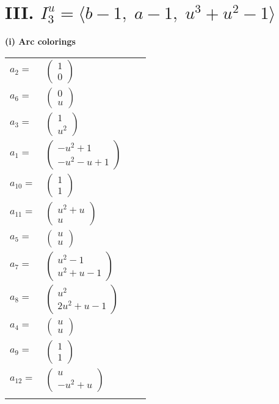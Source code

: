 \documentclass[1p]{elsarticle_modified}
\theoremstyle{definition}
\begin{document}
\centering \section*{III. $I^u_{3}= \langle b-1,\;a-1,\;u^3+u^2-1 \rangle$}
\flushleft \textbf{(i) Arc colorings}\\
\begin{tabular}{m{7pt} m{180pt} m{7pt} m{180pt} }
\flushright $a_{2}=$&$\begin{pmatrix}1\\0\end{pmatrix}$ \\
\flushright $a_{6}=$&$\begin{pmatrix}0\\u\end{pmatrix}$ \\
\flushright $a_{3}=$&$\begin{pmatrix}1\\u^2\end{pmatrix}$ \\
\flushright $a_{1}=$&$\begin{pmatrix}- u^2+1\\- u^2- u+1\end{pmatrix}$ \\
\flushright $a_{10}=$&$\begin{pmatrix}1\\1\end{pmatrix}$ \\
\flushright $a_{11}=$&$\begin{pmatrix}u^2+u\\u\end{pmatrix}$ \\
\flushright $a_{5}=$&$\begin{pmatrix}u\\u\end{pmatrix}$ \\
\flushright $a_{7}=$&$\begin{pmatrix}u^2-1\\u^2+u-1\end{pmatrix}$ \\
\flushright $a_{8}=$&$\begin{pmatrix}u^2\\2 u^2+u-1\end{pmatrix}$ \\
\flushright $a_{4}=$&$\begin{pmatrix}u\\u\end{pmatrix}$ \\
\flushright $a_{9}=$&$\begin{pmatrix}1\\1\end{pmatrix}$ \\
\flushright $a_{12}=$&$\begin{pmatrix}u\\- u^2+u\end{pmatrix}$\\&\end{tabular}
\end{document}
